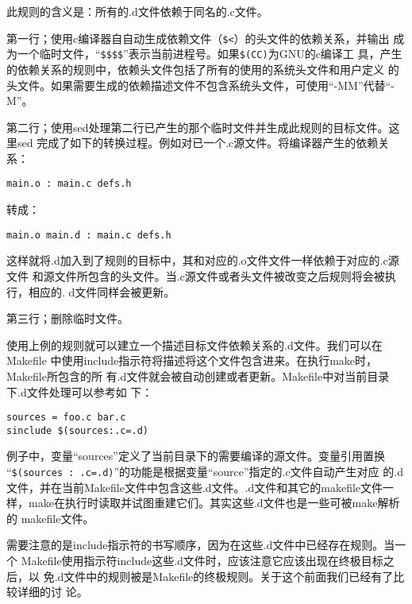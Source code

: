 此规则的含义是：所有的.d文件依赖于同名的.c文件。

第一行；使用c编译器自自动生成依赖文件（\verb"$<"）的头文件的依赖关系，并输出
成为一个临时文件，“\verb"$$$$"”表示当前进程号。如果\verb"$(CC)"为GNU的c编译工
具，产生的依赖关系的规则中，依赖头文件包括了所有的使用的系统头文件和用户定义
的头文件。如果需要生成的依赖描述文件不包含系统头文件，可使用“-MM”代替“-M”。

第二行；使用sed处理第二行已产生的那个临时文件并生成此规则的目标文件。这里sed
完成了如下的转换过程。例如对已一个.c源文件。将编译器产生的依赖关系：
\begin{Verbatim}[]
main.o : main.c defs.h
\end{Verbatim}
转成：
\begin{Verbatim}[]
main.o main.d : main.c defs.h
\end{Verbatim}

这样就将.d加入到了规则的目标中，其和对应的.o文件文件一样依赖于对应的.c源文件
和源文件所包含的头文件。当.c源文件或者头文件被改变之后规则将会被执行，相应的.
d文件同样会被更新。

第三行；删除临时文件。

使用上例的规则就可以建立一个描述目标文件依赖关系的.d文件。我们可以在Makefile
中使用include指示符将描述将这个文件包含进来。在执行make时，Makefile所包含的所
有.d文件就会被自动创建或者更新。Makefile中对当前目录下.d文件处理可以参考如
下：
\begin{Verbatim}[]
sources = foo.c bar.c
sinclude $(sources:.c=.d)
\end{Verbatim}

例子中，变量“sources”定义了当前目录下的需要编译的源文件。变量引用置换
“\verb"$(sources : .c=.d)"”的功能是根据变量“source”指定的.c文件自动产生对应
的.d文件，并在当前Makefile文件中包含这些.d文件。.d文件和其它的makefile文件一
样，make在执行时读取并试图重建它们。其实这些.d文件也是一些可被make解析的
makefile文件。

需要注意的是include指示符的书写顺序，因为在这些.d文件中已经存在规则。当一个
Makefile使用指示符include这些.d文件时，应该注意它应该出现在终极目标之后，以
免.d文件中的规则被是Makefile的终极规则。关于这个前面我们已经有了比较详细的讨
论。
